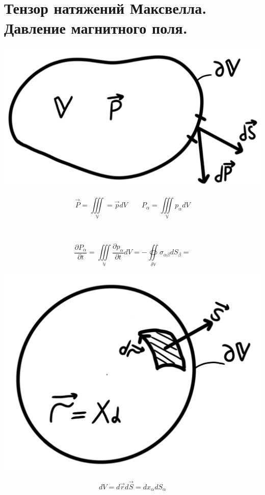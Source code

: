 \section{Тензор натяжений Максвелла. Давление магнитного поля.}

\begin{minipage}[c]{0.4\textwidth} %
    \includegraphics[width=\textwidth]{im/94.png}%
\end{minipage}%
\hfill
\begin{minipage}[c]{0.6\textwidth} %
    \[
    \vec{P}=\underset{\mathbb{V}}{\iiint}=\vec{p}dV 
    \qquad 
    P_{\alpha}=\underset{\mathbb{V}}{\iiint}p_{\alpha}dV
    \]
\end{minipage}

\( \text{ } \) 

\[
\frac{\partial P_{\alpha}}{\partial t}=
\underset{\mathbb{V}}{\iiint} \frac{\partial p_{\alpha}}{\partial t}dV=
-\underset{\delta \mathbb{V}}{\oiint} \sigma_{\alpha\beta}dS_{\beta} \boxed{=}
\]

\begin{minipage}[c]{0.4\textwidth} %
    \includegraphics[width=\textwidth]{im/95.png}%
\end{minipage}%
\hfill
\begin{minipage}[c]{0.6\textwidth} %
    \[
    dV=d\vec{r}d\vec{S}=dx_{\alpha}dS_{\alpha}  
    \]
\end{minipage}

